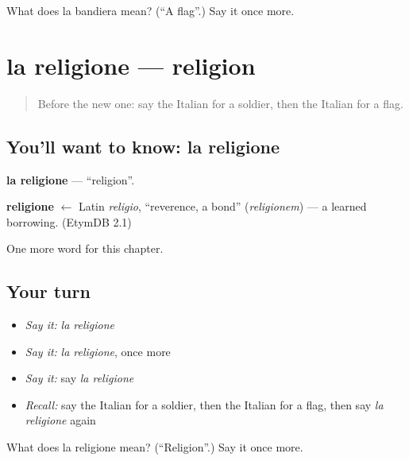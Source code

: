 \begin{tcolorbox}[breakable,colback=teal!4,colframe=teal!35!black,title={Before you move on}]
What does la bandiera mean? (\textquotedblleft{}A flag\textquotedblright{}.) Say it once more.
\end{tcolorbox}
\section[la religione]{la religione — religion}

\label{lesson:IT-C222-religione}



\begin{quote}
Before the new one: say the Italian for a soldier, then the Italian for a flag.
\end{quote}

\subsection*{You'll want to know: la religione}
\textbf{la religione} — \textquotedblleft{}religion\textquotedblright{}.

\begin{cousinweb}
\textbf{religione} $\leftarrow$ Latin \emph{religio}, \textquotedblleft{}reverence, a bond\textquotedblright{} (\emph{religionem}) — a learned borrowing. (EtymDB 2.1)
\end{cousinweb}

\begin{grammarlens}[title={What you've built}]
One more word for this chapter.
\end{grammarlens}

\subsection*{Your turn}
\begin{itemize}
\raggedright
  \item \emph{Say it:} \emph{la religione}
  \item \emph{Say it:} \emph{la religione}, once more
  \item \emph{Say it:} say \emph{la religione}
  \item \emph{Recall:} say the Italian for a soldier, then the Italian for a flag, then say \emph{la religione} again
\end{itemize}

\begin{tcolorbox}[breakable,colback=teal!4,colframe=teal!35!black,title={Before you move on}]
What does la religione mean? (\textquotedblleft{}Religion\textquotedblright{}.) Say it once more.
\end{tcolorbox}
